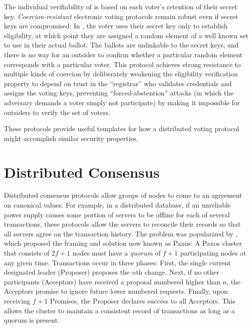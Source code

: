     The individual verifiability of \cite{neff} is based on each
    voter's retention of their secret key. \emph{Coercion-resistant} electronic
    voting protocols remain robust even if secret keys are compromised: In
    \cite{juels_coercion-resistant_2005}, the voter uses their secret key only
    to establish eligibility, at which point they are assigned a random element
    of a well known set to use in their actual ballot. The ballots are
    unlinkable to the secret keys, and there is no way for an outsider to
    confirm whether a particular random element corresponds with a particular
    voter. This protocol achieves strong resistance to multiple kinds of
    coercion by deliberately weakening the eligibility verification property to
    depend on trust in the ``registrar'' who validates credentials and assigns
    the voting keys, preventing ``forced-abstention'' attacks (in which the
    adversary demands a voter simply not participate) by making it impossible
    for outsiders to verify the set of voters.

    These protocols provide useful templates for how a distributed voting
    protocol might accomplish similar security properties.

  \section{Distributed Consensus}
    Distributed consensus protocols allow groups of nodes to come to an
    agreement on canonical values. For example, in a distributed database, if an
    unreliable power supply causes some portion of servers to be offline for
    each of several transactions, these protocols allow the
    servers to reconcile their records so that all servers agree on the
    transaction history. The problem was popularized by
    \cite{paxos}, which proposed the framing and solution now
    known as Paxos: A Paxos cluster that consists of 2$f+1$ nodes must have a
    \emph{quorum} of $f + 1$ participating nodes at any given time.
    Transactions occur in three phases: First, the single current designated
    leader (Proposer) proposes the $n$th change. Next, if no other participants
    (Acceptors) have received a proposal numbered higher than $n$, the Acceptors
    promise to ignore future lower numbered requests.  Finally, upon receiving
    $f+1$ Promises, the Proposer declares success to all Acceptors. This allows
    the cluster to maintain a consistent record of transactions as long as a
    quorum is present.


